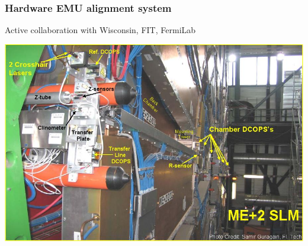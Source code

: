 \documentclass[compress]{beamer}
\begin{document}
\begin{frame}
\frametitle{Hardware EMU alignment system}
Active collaboration with Wisconsin, FIT, FermiLab
\begin{center}
\includegraphics[width=0.8\linewidth]{plots/hw_alignment/photo.jpg}
\end{center}
\end{frame}
\end{document}
